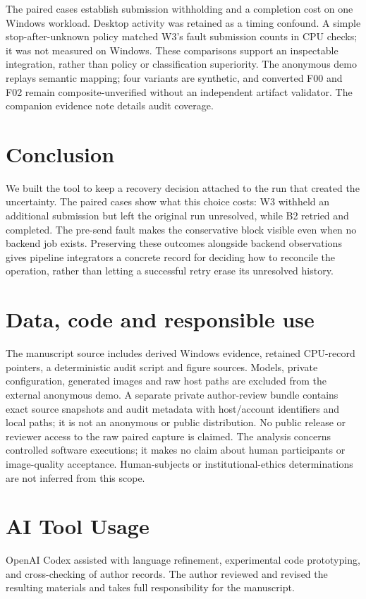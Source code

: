 \documentclass{ieeeaccess}
\begin{document}
The paired cases establish submission withholding and a completion cost on one
Windows workload. Desktop activity was retained as a timing confound. A simple
stop-after-unknown policy matched W3's fault submission counts in CPU checks;
it was not measured on Windows. These comparisons support an inspectable
integration, rather than policy or classification superiority.
The anonymous demo replays semantic mapping; four variants are
synthetic, and converted F00 and F02 remain composite-unverified without an
independent artifact validator. The companion evidence note details audit
coverage.

\section{Conclusion}

We built the tool to keep a recovery decision attached to the run that created
the uncertainty. The paired cases show what this choice costs: W3 withheld an
additional submission but left the original run unresolved, while B2 retried and
completed. The pre-send fault makes the conservative block visible even when
no backend job exists. Preserving these outcomes alongside backend observations
gives pipeline integrators a concrete record for deciding how to reconcile the
operation, rather than letting a successful retry erase its unresolved history.

\section*{Data, code and responsible use}
The manuscript source includes derived Windows evidence, retained CPU-record
pointers, a deterministic audit script and figure sources. Models, private
configuration, generated images and raw host paths are excluded from the
external anonymous demo. A separate private author-review bundle contains exact
source snapshots and audit metadata with host/account identifiers and local
paths; it is not an anonymous or public distribution. No public release or
reviewer access to the raw paired capture is claimed. The analysis concerns controlled software executions; it makes
no claim about human participants or image-quality acceptance. Human-subjects
or institutional-ethics determinations are not inferred from this scope.

\section*{AI Tool Usage}
OpenAI Codex assisted with language refinement, experimental code prototyping, and cross-checking of author records. The author reviewed and revised the resulting materials and takes full responsibility for the manuscript.



\EOD
\end{document}
